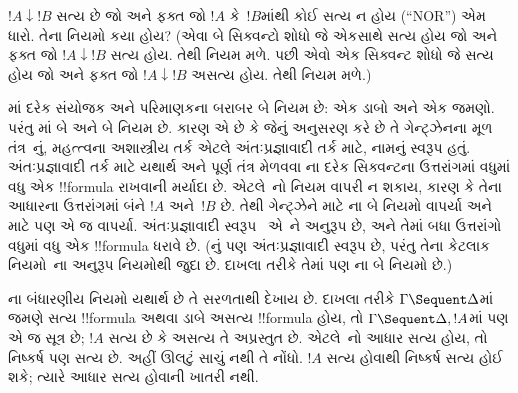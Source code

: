 \documentclass[../../../include/open-logic-section]{subfiles}
\begin{document}
\begin{prob}
$!A \downarrow !B$ સત્ય છે જો અને ફક્ત જો
$!A$ કે~$!B$માંથી કોઈ સત્ય ન હોય (``NOR'') એમ ધારો.
તેના  નિયમો કયા હોય?
(એવા બે સિક્વન્ટો શોધો જે એકસાથે સત્ય હોય
જો અને ફક્ત જો $!A \downarrow !B$ સત્ય હોય.
તેથી \RightR{\downarrow} નિયમ મળે.
પછી એવો એક સિક્વન્ટ શોધો જે સત્ય હોય
જો અને ફક્ત જો $!A \downarrow !B$ અસત્ય હોય.
તેથી \LeftR{\downarrow} નિયમ મળે.)
\end{prob}

માં દરેક સંયોજક અને પરિમાણકના બરાબર બે નિયમ છે:
એક ડાબો અને એક જમણો.
પરંતુ માં બે \LeftR{\land} અને બે \RightR{\lor} નિયમ છે.
કારણ એ છે કે  જેનું અનુસરણ કરે છે તે
ગેન્ટ્ઝેનના મૂળ તંત્ર~નું,
મહત્ત્વના અશાસ્ત્રીય તર્ક એટલે અંતઃપ્રજ્ઞાવાદી તર્ક માટે,
 નામનું સ્વરૂપ હતું.
અંતઃપ્રજ્ઞાવાદી તર્ક માટે યથાર્થ અને પૂર્ણ તંત્ર મેળવવા
ના દરેક સિક્વન્ટના ઉત્તરાંગમાં
વધુમાં વધુ એક !!{formula} રાખવાની મર્યાદા છે.
એટલે~નો \RightR{\lor} નિયમ વાપરી ન શકાય,
કારણ કે તેના આધારના ઉત્તરાંગમાં બંને $!A$ અને~$!B$ છે.
તેથી ગેન્ટ્ઝેને  માટે \RightR{\lor}ના
બે નિયમો વાપર્યા અને  માટે પણ એ જ વાપર્યા.
અંતઃપ્રજ્ઞાવાદી સ્વરૂપ~ એ~ને અનુરૂપ છે,
અને તેમાં બધા ઉત્તરાંગો વધુમાં વધુ એક !!{formula} ધરાવે છે.
(નું પણ અંતઃપ્રજ્ઞાવાદી સ્વરૂપ છે,
પરંતુ તેના કેટલાક નિયમો~ના અનુરૂપ નિયમોથી જુદા છે.
દાખલા તરીકે તેમાં પણ \RightR{\lor}ના બે નિયમો છે.)

ના બંધારણીય નિયમો યથાર્થ છે તે સરળતાથી દેખાય છે.
દાખલા તરીકે $\Gamma \Sequent \Delta$માં
જમણે સત્ય !!{formula} અથવા ડાબે અસત્ય !!{formula} હોય,
તો $\Gamma \Sequent \Delta, !A$માં પણ એ જ સૂત્ર છે;
$!A$ સત્ય છે કે અસત્ય તે અપ્રસ્તુત છે.
એટલે~\RightR{\Weakening}નો આધાર સત્ય હોય, તો નિષ્કર્ષ પણ સત્ય છે.
અહીં ઊલટું સાચું નથી તે નોંધો.
$!A$ સત્ય હોવાથી નિષ્કર્ષ સત્ય હોઈ શકે;
ત્યારે આધાર સત્ય હોવાની ખાતરી નથી.
\end{document}
